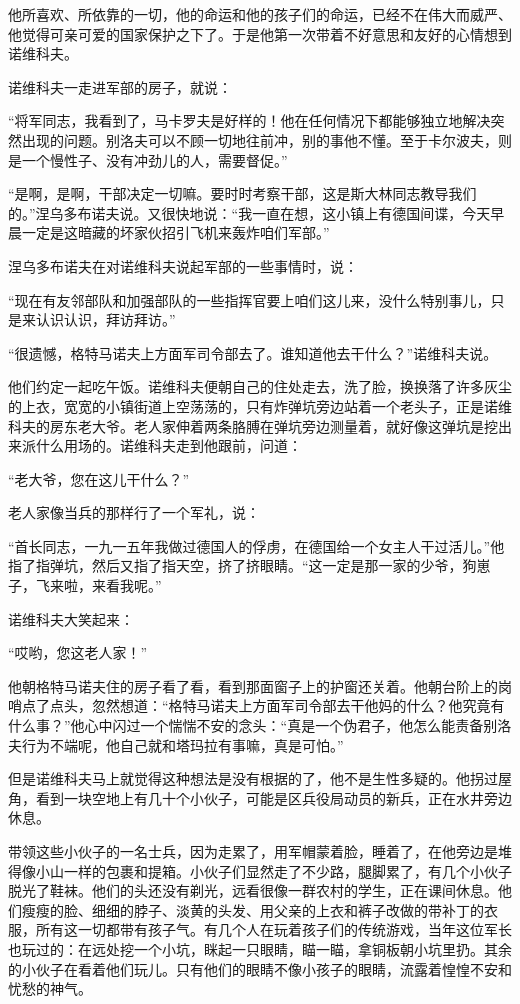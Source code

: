 他所喜欢、所依靠的一切，他的命运和他的孩子们的命运，已经不在伟大而威严、他觉得可亲可爱的国家保护之下了。于是他第一次带着不好意思和友好的心情想到诺维科夫。

诺维科夫一走进军部的房子，就说：

“将军同志，我看到了，马卡罗夫是好样的！他在任何情况下都能够独立地解决突然出现的问题。别洛夫可以不顾一切地往前冲，别的事他不懂。至于卡尔波夫，则是一个慢性子、没有冲劲儿的人，需要督促。”

“是啊，是啊，干部决定一切嘛。要时时考察干部，这是斯大林同志教导我们的。”涅乌多布诺夫说。又很快地说：“我一直在想，这小镇上有德国间谍，今天早晨一定是这暗藏的坏家伙招引飞机来轰炸咱们军部。”

涅乌多布诺夫在对诺维科夫说起军部的一些事情时，说：

“现在有友邻部队和加强部队的一些指挥官要上咱们这儿来，没什么特别事儿，只是来认识认识，拜访拜访。”

“很遗憾，格特马诺夫上方面军司令部去了。谁知道他去干什么？”诺维科夫说。

他们约定一起吃午饭。诺维科夫便朝自己的住处走去，洗了脸，换换落了许多灰尘的上衣，宽宽的小镇街道上空荡荡的，只有炸弹坑旁边站着一个老头子，正是诺维科夫的房东老大爷。老人家伸着两条胳膊在弹坑旁边测量着，就好像这弹坑是挖出来派什么用场的。诺维科夫走到他跟前，问道：

“老大爷，您在这儿干什么？”

老人家像当兵的那样行了一个军礼，说：

“首长同志，一九一五年我做过德国人的俘虏，在德国给一个女主人干过活儿。”他指了指弹坑，然后又指了指天空，挤了挤眼睛。“这一定是那一家的少爷，狗崽子，飞来啦，来看我呢。”

诺维科夫大笑起来：

“哎哟，您这老人家！”

他朝格特马诺夫住的房子看了看，看到那面窗子上的护窗还关着。他朝台阶上的岗哨点了点头，忽然想道：“格特马诺夫上方面军司令部去干他妈的什么？他究竟有什么事？”他心中闪过一个惴惴不安的念头：“真是一个伪君子，他怎么能责备别洛夫行为不端呢，他自己就和塔玛拉有事嘛，真是可怕。”

但是诺维科夫马上就觉得这种想法是没有根据的了，他不是生性多疑的。他拐过屋角，看到一块空地上有几十个小伙子，可能是区兵役局动员的新兵，正在水井旁边休息。

带领这些小伙子的一名士兵，因为走累了，用军帽蒙着脸，睡着了，在他旁边是堆得像小山一样的包裹和提箱。小伙子们显然走了不少路，腿脚累了，有几个小伙子脱光了鞋袜。他们的头还没有剃光，远看很像一群农村的学生，正在课间休息。他们瘦瘦的脸、细细的脖子、淡黄的头发、用父亲的上衣和裤子改做的带补丁的衣服，所有这一切都带有孩子气。有几个人在玩着孩子们的传统游戏，当年这位军长也玩过的：在远处挖一个小坑，眯起一只眼睛，瞄一瞄，拿铜板朝小坑里扔。其余的小伙子在看着他们玩儿。只有他们的眼睛不像小孩子的眼睛，流露着惶惶不安和忧愁的神气。

